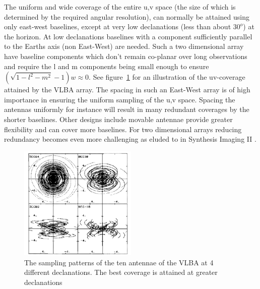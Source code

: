 \documentclass[a4paper,10pt]{report}
\begin{document}
The uniform and wide coverage of the entire u,v space (the size of which is determined by the required angular resolution), can normally be attained using only east-west baselines, except at very low declanations (less than about $30^o$) at the horizon. At low declanations baselines 
with a component sufficiently parallel to the Earths axis (non East-West) are needed. Such a two dimensional array have baseline components which don't remain co-planar over long observations and require the l and m components being small enough to 
ensure $(\sqrt{1 - l^2 - m^2} - 1)w \approx 0$. See figure~\ref{fig_VLBA_uv} for an illustration of the uv-coverage attained by the VLBA array. The spacing in such an East-West array is of high importance
in ensuring the uniform sampling of the u,v space. Spacing the antennas uniformly for instance will result in many redundant coverages by the shorter baselines. Other designs include movable
antennae provide greater flexibility and can cover more baselines. For two dimensional arrays reducing redundancy becomes even more challenging as eluded to in Synthesis Imaging II \cite[Lecture 2]{taylor1999synthesis}.

\begin{figure}[h]
 \begin{mdframed}
 \centering
 \includegraphics[width=0.5\textwidth]{images/eliptical_sampling.png}
 \caption[VLBA uv-coverage]{The sampling patterns of the ten antennae of the VLBA at 4 different declanations. The best coverage is attained at greater declanations}
  \label{fig_VLBA_uv}
 \end{mdframed}
\end{figure}
\end{document}
